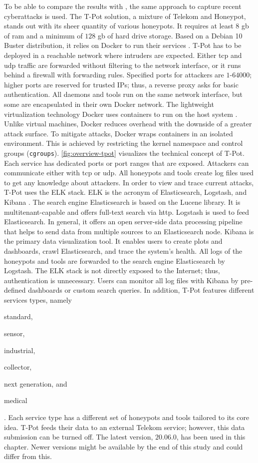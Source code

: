 To be able to compare the results with \citet{Kelly2021}, the same approach to capture recent cyberattacks is used.
The T-Pot solution, a mixture of Telekom and Honeypot, stands out with its sheer quantity of various honeypots.
It requires at least $8$ \ac{gb} of \ac{ram} and a minimum of $128$ \ac{gb} of hard drive storage.
Based on a Debian 10 Buster distribution, it relies on Docker to run their services \cite{docker2021}.
T-Pot has to be deployed in a reachable network where intruders are expected.
Either \ac{tcp} and \ac{udp} traffic are forwarded without filtering to the network interface, or it runs behind a firewall with forwarding rules.
Specified ports for attackers are $1$-$64000$; higher ports are reserved for trusted IPs; thus, a reverse proxy asks for basic authentication.
All daemons and tools run on the same network interface, but some are encapsulated in their own Docker network.
The lightweight virtualization technology Docker uses containers to run on the host system \cite{combe2016}.
Unlike virtual machines, Docker reduces overhead with the downside of a greater attack surface.
To mitigate attacks, Docker wraps containers in an isolated environment.
This is achieved by restricting the kernel namespace and control groups (\verb|cgroups|).
\autoref{fig:overview-tpot} visualizes the technical concept of T-Pot.
Each service has dedicated ports or port ranges that are exposed.
Attackers can communicate either with \ac{tcp} or \ac{udp}.
All honeypots and tools create log files used to get any knowledge about attackers.
In order to view and trace current attacks, T-Pot uses the ELK stack.
ELK is the acronym of Elasticsearch, Logstash, and Kibana \cite{elastic2021}.
The search engine Elasticsearch is based on the Lucene library.
It is multitenant-capable and offers full-text search via \ac{http}.
Logstash is used to feed Elasticsearch.
In general, it offers an open server-side data processing pipeline that helps to send data from multiple sources to an Elasticsearch node.
Kibana is the primary data visualization tool.
It enables users to create plots and dashboards, crawl Elasticsearch, and trace the system's health.
All logs of the honeypots and tools are forwarded to the search engine Elasticsearch by Logstash.
The ELK stack is not directly exposed to the Internet; thus, authentication is unnecessary.
Users can monitor all log files with Kibana by pre-defined dashboards or custom search queries.
In addition, T-Pot features different services types, namely
\begin{enumerate*}[label=(\roman*)]
    \item standard,
    \item sensor,
    \item industrial,
    \item collector,
    \item next generation, and
    \item medical
\end{enumerate*}.
Each service type has a different set of honeypots and tools tailored to its core idea.
T-Pot feeds their data to an external Telekom service; however, this data submission can be turned off.
The latest version, $20.06.0$, has been used in this chapter.
Newer versions might be available by the end of this study and could differ from this.

